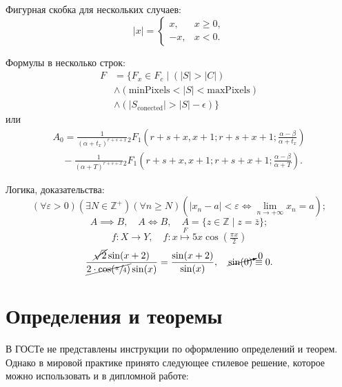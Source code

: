 Фигурная скобка для нескольких случаев:
\begin{equation}
    |x| =
    \begin{cases}
        x, & x \ge 0, \\
        -x, & x< 0.
    \end{cases}
\end{equation}

Формулы в несколько строк:
\begin{align}
    F &= \{ F_{x} \in F_{c} \mid (|S| > |C|) \\
      &\wedge (\mathrm{minPixels} < |S| < \mathrm{maxPixels}) \\
      &\wedge (|S_{\mathrm{conected}}| > |S| - \epsilon) \}
\end{align}
или
\begin{multline}
    A_0 = \frac{1}{(\alpha + t_x)^{r + s + x}}{}_2 F_1 \left( r + s + x, x + 1; r + s + x + 1; \frac{\alpha - \beta}{\alpha + t_x} \right) \\
    \quad - \frac{1}{(\alpha + T)^{r + s + x}}{}_2 F_1 \left( r + s + x, x + 1; r + s + x + 1; \frac{\alpha - \beta}{\alpha + T} \right).
\end{multline}

Логика, доказательства:
\begin{equation}
    (\forall \varepsilon > 0) (\exists N \in \mathbb Z^+) (\forall n \ge N) (|x_n - a| < \varepsilon \iff \lim_{n \to +\infty} x_n = a);
\end{equation}
\begin{equation}
    A \implies B, \quad A \iff B, \quad A = \{z \in \mathbb Z \mid z = \bar z \};
\end{equation}
\begin{equation}
    f: X \to Y, \quad f: x \overset{F}{\mapsto} 5x \cos(\tfrac{\pi x}{2})
\end{equation}
\begin{equation}
    \frac{\cancel{\sqrt 2} \sin(x + 2)}{\cancel{2 \cdot \cos(\sfrac{\pi}{4})} \sin(x)} = \frac{\sin(x + 2)}{\sin(x)}, \quad \cancelto{0}{\sin(0)} \equiv 0.
\end{equation}

\section{Определения и теоремы}

В ГОСТе не представлены инструкции по оформлению определений и теорем. Однако в мировой практике принято следующее стилевое решение, которое можно использовать и в дипломной работе:


